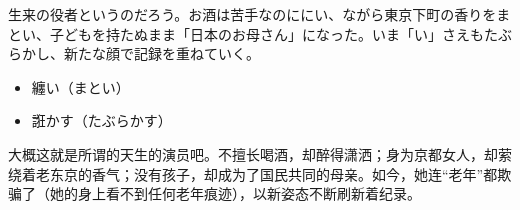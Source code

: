 \documentclass{ctexart}
\newcommand{\bbigbreak}{\bigbreak \bigbreak}
\begin{document}
\bbigbreak

\mincho
生来の役者というのだろう。お酒は苦手なのににい、ながら東京下町の香りをまとい、子どもを持たぬまま「日本のお母さん」になった。いま「い」さえもたぶらかし、新たな顔で記録を重ねていく。

\begin{itemize}
    \mincho
    \item 纏い（まとい）
    \item 誑かす（たぶらかす）
\end{itemize}

\rmfamily
大概这就是所谓的天生的演员吧。不擅长喝酒，却醉得潇洒；身为京都女人，却萦绕着老东京的香气；没有孩子，却成为了国民共同的母亲。如今，她连“老年”都欺骗了（她的身上看不到任何老年痕迹），以新姿态不断刷新着纪录。

\bbigbreak


\end{document}
